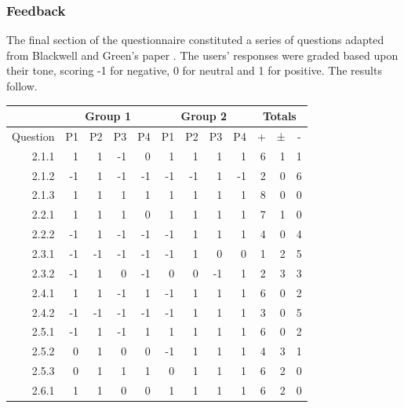 \documentclass[12pt,twoside,notitlepage,xetex]{report}
\begin{document}
{\subsubsection{Feedback}

The final section of the questionnaire constituted a series of questions adapted from Blackwell and Green's paper \cite{Blackwell2000}.  The users' responses were graded based upon their tone, scoring -1 for negative, 0 for neutral and 1 for positive.  The results follow.

\begin{center}
\begin{table}[H]
\begin{center}
\begin{tabular}{|r||r|r|r|r||r|r|r|r||r|r|r|}
\cline{2-12}
\multicolumn{1}{c}{} & \multicolumn{4}{|c|}{Group 1} & \multicolumn{4}{c||}{Group 2} & \multicolumn{3}{c|}{Totals}\\ \hline
\multicolumn{1}{|c||}{Question} & \multicolumn{1}{c|}{P1} & \multicolumn{1}{c|}{P2} & \multicolumn{1}{c|}{P3} & \multicolumn{1}{c||}{P4} & \multicolumn{1}{c|}{P1} & \multicolumn{1}{c|}{P2} & \multicolumn{1}{c|}{P3} & \multicolumn{1}{c||}{P4} & \multicolumn{1}{c|}{+} & \multicolumn{1}{c|}{±} & \multicolumn{1}{c|}{-}\\ \hline \hline
2.1.1 & 1 & 1 & -1 & 0 & 1 & 1 & 1 & 1 & 6 & 1 & 1\\ \hline
2.1.2 & -1 & 1 & -1 & -1 & -1 & -1 & 1 & -1 & 2 & 0 & 6\\ \hline
2.1.3 & 1 & 1 & 1 & 1 & 1 & 1 & 1 & 1 & 8 & 0 & 0\\ \hline
2.2.1 & 1 & 1 & 1 & 0 & 1 & 1 & 1 & 1 & 7 & 1 & 0\\ \hline
2.2.2 & -1 & 1 & -1 & -1 & -1 & 1 & 1 & 1 & 4 & 0 & 4\\ \hline
2.3.1 & -1 & -1 & -1 & -1 & -1 & 1 & 0 & 0 & 1 & 2 & 5\\ \hline
2.3.2 & -1 & 1 & 0 & -1 & 0 & 0 & -1 & 1 & 2 & 3 & 3\\ \hline
2.4.1 & 1 & 1 & -1 & 1 & -1 & 1 & 1 & 1 & 6 & 0 & 2\\ \hline
2.4.2 & -1 & -1 & -1 & -1 & -1 & 1 & 1 & 1 & 3 & 0 & 5\\ \hline
2.5.1 & -1 & 1 & -1 & 1 & 1 & 1 & 1 & 1 & 6 & 0 & 2\\ \hline
2.5.2 & 0 & 1 & 0 & 0 & -1 & 1 & 1 & 1 & 4 & 3 & 1\\ \hline
2.5.3 & 0 & 1 & 1 & 1 & 0 & 1 & 1 & 1 & 6 & 2 & 0\\ \hline
2.6.1 & 1 & 1 & 0 & 0 & 1 & 1 & 1 & 1 & 6 & 2 & 0\\ \hline

\end{tabular}
\end{center}
\end{table}
\end{center}}
\end{document}
